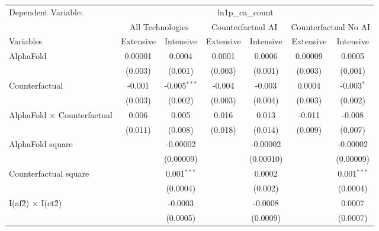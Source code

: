 \begingroup
\centering
\begin{tabular}{lcccccc}
   \tabularnewline \midrule \midrule
   Dependent Variable: & \multicolumn{6}{c}{ln1p\_ca\_count}\\
 & \multicolumn{2}{c}{All Technologies} & \multicolumn{2}{c}{Counterfactual AI} & \multicolumn{2}{c}{Counterfactual No AI} \\
\cmidrule(lr){1-1}\cmidrule(lr){2-3} \cmidrule(lr){4-5} \cmidrule(lr){6-7}
Variables & \multicolumn{1}{c}{Extensive} & \multicolumn{1}{c}{Intensive} & \multicolumn{1}{c}{Extensive} & \multicolumn{1}{c}{Intensive} & \multicolumn{1}{c}{Extensive} & \multicolumn{1}{c}{Intensive} \\
\cmidrule(lr){1-1}\cmidrule(lr){2-2} \cmidrule(lr){3-3} \cmidrule(lr){4-4} \cmidrule(lr){5-5} \cmidrule(lr){6-6} \cmidrule(lr){7-7}
   AlphaFold                          & 0.00001 & 0.0004         & 0.0001  & 0.0006    & 0.00009 & 0.0005\\   
                                      & (0.003) & (0.001)        & (0.003) & (0.001)   & (0.003) & (0.001)\\   
   Counterfactual                     & -0.001  & -0.005$^{***}$ & -0.004  & -0.003    & 0.0004  & -0.003$^{*}$\\   
                                      & (0.003) & (0.002)        & (0.003) & (0.004)   & (0.003) & (0.002)\\   
   AlphaFold $\times$ Counterfactual  & 0.006   & 0.005          & 0.016   & 0.013     & -0.011  & -0.008\\   
                                      & (0.011) & (0.008)        & (0.018) & (0.014)   & (0.009) & (0.007)\\   
   AlphaFold square                   &         & -0.00002       &         & -0.00002  &         & -0.00002\\   
                                      &         & (0.00009)      &         & (0.00010) &         & (0.00009)\\   
   Counterfactual square              &         & 0.001$^{***}$  &         & 0.0002    &         & 0.001$^{***}$\\   
                                      &         & (0.0004)       &         & (0.002)   &         & (0.0004)\\   
   I(af\^2) $\times$ I(ct\^2)         &         & -0.0003        &         & -0.0008   &         & 0.0007\\   
                                      &         & (0.0005)       &         & (0.0009)  &         & (0.0007)\\   

\end{tabular}
